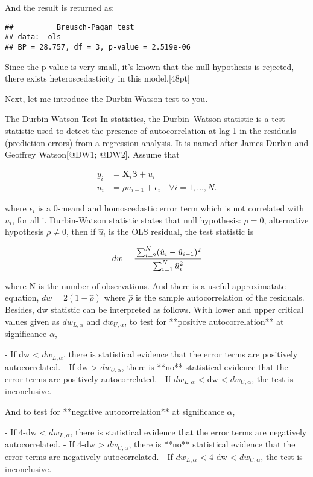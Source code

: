 \documentclass[
  12pt,
]{article}
\begin{document}
And the result is returned as:

\begin{verbatim}
##          Breusch-Pagan test
## data:  ols
## BP = 28.757, df = 3, p-value = 2.519e-06
\end{verbatim}

Since the p-value is very small, it's known that the null hypothesis is rejected, there exists heteroscedasticity in this model.{[}48pt{]}

Next, let me introduce the Durbin-Watson test to you.

\begin{itembox}[1]{The Durbin-Watson Test}
In statistics, the Durbin–Watson statistic is a test statistic used to detect the presence of autocorrelation at lag 1 in the residuals (prediction errors) from a regression analysis. It is named after James Durbin and Geoffrey Watson[@DW1; @DW2].
Assume that

\begin{align*}
        y_i & = \mathbf{X}_i \mathbf{\beta} + u_i  \\
        u_i & = \rho u_{i-1} + \epsilon_i \quad \forall i = 1, \dots, N.
\end{align*}

where $\epsilon_i$ is a 0-meand and homoscedastic error term which is not correlated with $u_i$, for all i. Durbin-Watson statistic states that null hypothesis: $\rho = 0$, alternative hypothesis $\rho \neq 0$, then if $\hat{u}_i$ is the OLS residual, the test statistic is 

$$
    dw = \cfrac{\sum_{i=2}^{N} (\hat{u}_i - \hat{u}_{i-1})^2}{\sum_{i=1}^{N} \hat{u}_i^2}
$$

where N is the number of observations. And there is a useful approximatate equation, $dw = 2(1-\hat{\rho})$ where $\hat{\rho}$ is the sample autocorrelation of the residuals. Besides, dw statistic can be interpreted as follows.
With lower and upper critical values given as $dw_{L,\alpha}$ and $dw_{U,\alpha}$, to test for **positive autocorrelation** at significance $\alpha$, 

- If dw < $dw_{L,\alpha}$, there is statistical evidence that the error terms are positively autocorrelated.
- If dw > $dw_{U,\alpha}$, there is **no** statistical evidence that the error terms are positively autocorrelated.
- If $dw_{L,\alpha}$ < dw < $dw_{U,\alpha} $, the test is inconclusive.

And to test for **negative autocorrelation** at significance $\alpha$,

- If 4-dw < $dw_{L,\alpha}$, there is statistical evidence that the error terms are negatively autocorrelated.
- If 4-dw > $dw_{U,\alpha}$, there is **no** statistical evidence that the error terms are negatively autocorrelated.
- If $dw_{L,\alpha}$ < 4-dw < $dw_{U,\alpha} $, the test is inconclusive.
\end{itembox}
\end{document}
